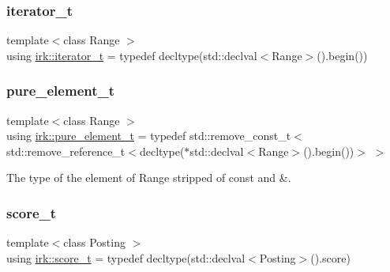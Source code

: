 \mbox{\label{namespaceirk_a333e3104afd57c79fb0c18b90081520a}} 
\subsubsection{\texorpdfstring{iterator\+\_\+t}{iterator\_t}}
{\footnotesize\ttfamily template$<$class Range $>$ \\
using \mbox{\hyperlink{namespaceirk_a333e3104afd57c79fb0c18b90081520a}{irk\+::iterator\+\_\+t}} = typedef decltype(std\+::declval$<$Range$>$().begin())}

\mbox{\label{namespaceirk_a1e48b43a3f40d553264380da5e7263c1}} 
\subsubsection{\texorpdfstring{pure\+\_\+element\+\_\+t}{pure\_element\_t}}
{\footnotesize\ttfamily template$<$class Range $>$ \\
using \mbox{\hyperlink{namespaceirk_a1e48b43a3f40d553264380da5e7263c1}{irk\+::pure\+\_\+element\+\_\+t}} = typedef std\+::remove\+\_\+const\+\_\+t$<$ std\+::remove\+\_\+reference\+\_\+t$<$decltype($\ast$std\+::declval$<$Range$>$().begin())$>$ $>$}



The type of the element of Range stripped of {\ttfamily const} and {\ttfamily \&}. 

\mbox{\label{namespaceirk_a87bce44d1e3fdff0b1b3bb78f2a5f924}} 
\subsubsection{\texorpdfstring{score\+\_\+t}{score\_t}}
{\footnotesize\ttfamily template$<$class Posting $>$ \\
using \mbox{\hyperlink{namespaceirk_a87bce44d1e3fdff0b1b3bb78f2a5f924}{irk\+::score\+\_\+t}} = typedef decltype(std\+::declval$<$Posting$>$().score)}

\mbox{\label{namespaceirk_a9ce0dc691e62f8bbf0578ea3d778d18d}} 
